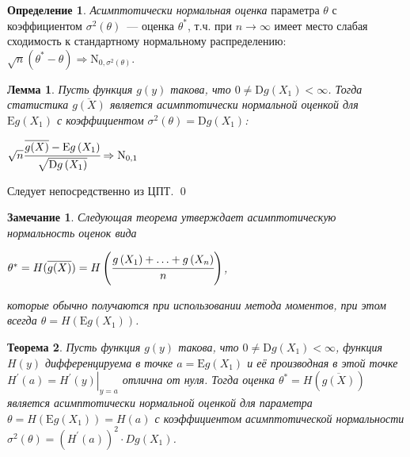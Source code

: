 \documentclass[oneside,final,14pt]{extreport}
\renewenvironment{proof}{{\bfseries Доказательство.}}{\qed}
\newtheorem{thm}{Теорема}[section]
\newtheorem{lem}[thm]{Лемма}
\newtheorem*{rmrk}{Замечание}
\theoremstyle{definition}
\newtheorem{defn}{Определение}[section]
\begin{document}
\begin{defn}
{\it Асимптотически нормальная оценка} параметра \(\theta\) с коэффициентом \(\sigma^{2}(\theta)\)~--- оценка \(\theta^{*}\), т.ч. при \(n \rightarrow \infty\) имеет место слабая сходимость к стандартному нормальному распределению: \( \sqrt{n}(\theta^{*}-\theta) \Rightarrow \mathrm{N}_{0, \sigma^{2}(\theta)}\).
\end{defn}

\begin{lem}
Пусть функция \(g(y)\) такова, что \(0 \neq \mathrm{D} g\left(X_{1}\right)<\infty\). Тогда статистика \(\overline{g(X)}\) является асимптотически нормальной оценкой для \(\mathrm{E} g\left(X_{1}\right)\) с коэффициентом \(\sigma^{2}(\theta)=\mathrm{D} g\left(X_{1}\right)\):

\( \sqrt{n} \cfrac{\overline{g(X)}-\mathrm{E} g\left(X_{1}\right)}{\sqrt{\mathrm{D} g\left(X_{1}\right)}} \Rightarrow \mathrm{N}_{0,1} \)
\end{lem}

\begin{proof}
Следует непосредственно из ЦПТ.
\end{proof}

\begin{rmrk}
Следующая теорема утверждает асимптотическую нормальность оценок вида

\(\theta^{*}=H(\overline{g(X)})=H\left(\cfrac{g\left(X_{1}\right)+\ldots+g\left(X_{n}\right)}{n}\right)\),

которые обычно получаются при использовании метода моментов, при этом всегда \(\theta=H\left(\mathrm{E} g\left(X_{1}\right)\right)\).
\end{rmrk}

\begin{thm}
Пусть функция \(g(y)\) такова, что \(0 \neq \mathrm{D} g\left(X_{1}\right)<\infty\), функция \(H(y)\) дифференцируема в точке \(a=\mathrm{E} g\left(X_{1}\right)\) и её производная в этой точке \(H^{\prime}(a)=\left.H^{\prime}(y)\right|_{y=a}\) отлична от нуля. Тогда оценка \(\theta^{*}=H(\overline{g(X)})\)
является асимптотически нормальной
оценкой для параметра \(\theta=H\left(\mathrm{E} g\left(X_{1}\right)\right)=H(a)\) с коэффициентом асимптотической нормальности \(\sigma^{2}(\theta)=\left(H^{\prime}(a)\right)^{2} \cdot D g\left(X_{1}\right)\).
\end{thm}
\end{document}
